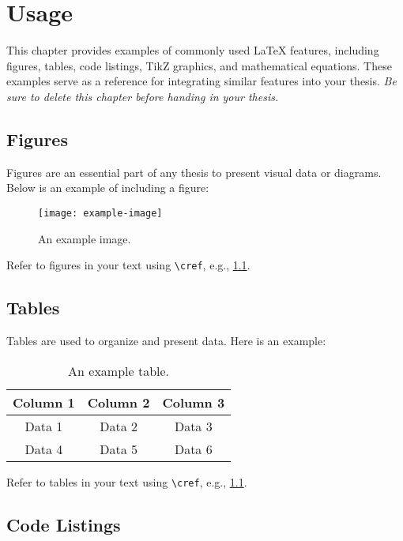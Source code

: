 \chapter{Usage}

This chapter provides examples of commonly used LaTeX features, including figures, tables, code listings, TikZ graphics, and mathematical equations.
These examples serve as a reference for integrating similar features into your thesis.
\textit{Be sure to delete this chapter before handing in your thesis.}

\section{Figures}

Figures are an essential part of any thesis to present visual data or diagrams. Below is an example of including a figure:

\begin{figure}[h!]
    \centering
    \texttt{[image: example-image]}
    \caption{An example image.}
    \label{fig:example}
\end{figure}

Refer to figures in your text using \texttt{\textbackslash cref}, e.g., \cref{fig:example}.

\section{Tables}

Tables are used to organize and present data. Here is an example:

\begin{table}[h!]
    \centering
    \begin{tabular}{|c|c|c|}
        \hline
        Column 1 & Column 2 & Column 3 \\
        \hline
        Data 1   & Data 2   & Data 3   \\
        Data 4   & Data 5   & Data 6   \\
        \hline
    \end{tabular}
    \caption{An example table.}
    \label{tab:example}
\end{table}

Refer to tables in your text using \texttt{\textbackslash cref}, e.g., \cref{tab:example}.

\section{Code Listings}

